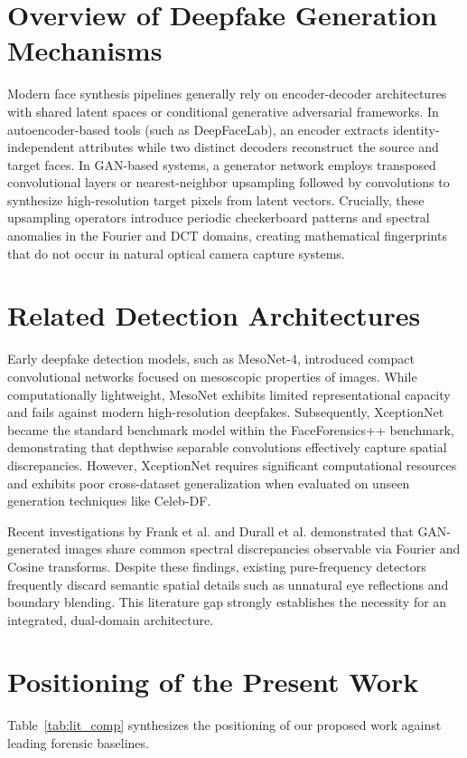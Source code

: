 \documentclass[12pt,a4paper]{report}
\begin{document}
\section{Overview of Deepfake Generation Mechanisms}
Modern face synthesis pipelines generally rely on encoder-decoder architectures with shared latent spaces or conditional generative adversarial frameworks. In autoencoder-based tools (such as DeepFaceLab), an encoder extracts identity-independent attributes while two distinct decoders reconstruct the source and target faces. In GAN-based systems, a generator network employs transposed convolutional layers or nearest-neighbor upsampling followed by convolutions to synthesize high-resolution target pixels from latent vectors. Crucially, these upsampling operators introduce periodic checkerboard patterns and spectral anomalies in the Fourier and DCT domains, creating mathematical fingerprints that do not occur in natural optical camera capture systems.

\section{Related Detection Architectures}
Early deepfake detection models, such as MesoNet-4, introduced compact convolutional networks focused on mesoscopic properties of images. While computationally lightweight, MesoNet exhibits limited representational capacity and fails against modern high-resolution deepfakes. Subsequently, XceptionNet became the standard benchmark model within the FaceForensics++ benchmark, demonstrating that depthwise separable convolutions effectively capture spatial discrepancies. However, XceptionNet requires significant computational resources and exhibits poor cross-dataset generalization when evaluated on unseen generation techniques like Celeb-DF.

Recent investigations by Frank et al. and Durall et al. demonstrated that GAN-generated images share common spectral discrepancies observable via Fourier and Cosine transforms. Despite these findings, existing pure-frequency detectors frequently discard semantic spatial details such as unnatural eye reflections and boundary blending. This literature gap strongly establishes the necessity for an integrated, dual-domain architecture.

\section{Positioning of the Present Work}
Table~\ref{tab:lit_comp} synthesizes the positioning of our proposed work against leading forensic baselines.
\end{document}
